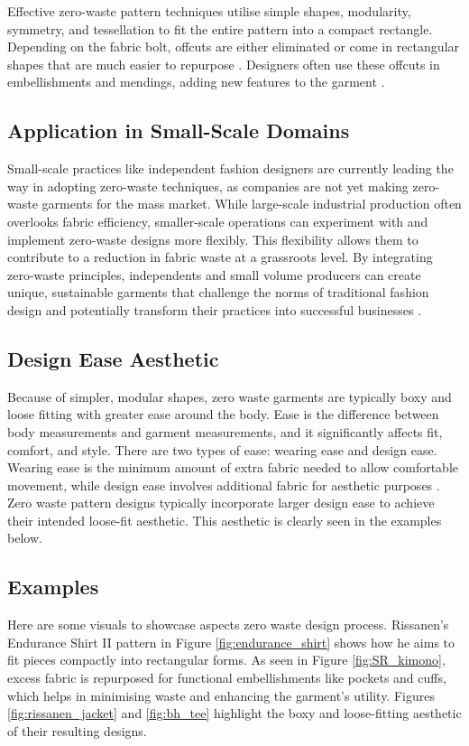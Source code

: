 Effective zero-waste pattern techniques utilise simple shapes, modularity, symmetry, and tessellation to fit the entire pattern into a compact rectangle. Depending on the fabric bolt, offcuts are either eliminated or come in rectangular shapes that are much easier to repurpose \cite{helmersson_zero_2023}. Designers often use these offcuts in embellishments and mendings, adding new features to the garment \cite{noauthor_introducing_2024}.

\subsection{Application in Small-Scale Domains}
Small-scale practices like independent fashion designers are currently leading the way in adopting zero-waste techniques, as companies are not yet making zero-waste garments for the mass market. While large-scale industrial production often overlooks fabric efficiency, smaller-scale operations can experiment with and implement zero-waste designs more flexibly. This flexibility allows them to contribute to a reduction in fabric waste at a grassroots level. By integrating zero-waste principles, independents and small volume producers can create unique, sustainable garments that challenge the norms of traditional fashion design and potentially transform their practices into successful businesses \cite{}.

\subsection{Design Ease Aesthetic}
Because of simpler, modular shapes, zero waste garments are typically boxy and loose fitting with greater ease around the body. Ease is the difference between body measurements and garment measurements, and it significantly affects fit, comfort, and style. There are two types of ease: wearing ease and design ease. Wearing ease is the minimum amount of extra fabric needed to allow comfortable movement, while design ease involves additional fabric for aesthetic purposes \cite{tessa_what_2022}. Zero waste pattern designs typically incorporate larger design ease to achieve their intended loose-fit aesthetic. This aesthetic is clearly seen in the examples below.

\subsection{Examples}
Here are some visuals to showcase aspects zero waste design process. Rissanen's Endurance Shirt II pattern in Figure \ref{fig:endurance_shirt} shows how he aims to fit pieces compactly into rectangular forms. As seen in Figure \ref{fig:SR_kimono}, excess fabric is repurposed for functional embellishments like pockets and cuffs, which helps in minimising waste and enhancing the garment's utility. Figures \ref{fig:rissanen_jacket} and \ref{fig:bh_tee} highlight the boxy and loose-fitting aesthetic of their resulting designs.

